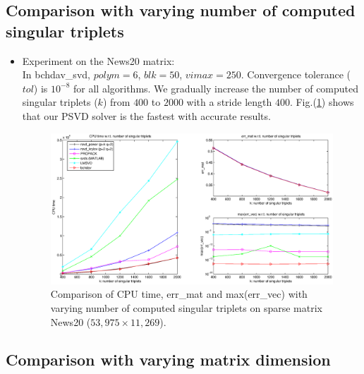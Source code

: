 \documentclass[11pt]{article}
\numberwithin{equation}{section}
\numberwithin{figure}{section}
\numberwithin{table}{section}
\begin{document}
\subsection{Comparison with varying number of computed singular triplets}
\begin{itemize}
\item Experiment on the News20 matrix:\\ 
In bchdav\_svd, $polym = 6$, $blk = 50$, $vimax = 250$. Convergence tolerance ($tol$) is $10^{-8}$ for all algorithms. We gradually increase the number of computed singular triplets ($k$) from $400$ to $2000$ with a stride length $400$. Fig.(\ref{news20_varyk}) shows that our PSVD solver is the fastest with accurate results.

\begin{figure}
\centering
\includegraphics[scale=0.5]{news20_varyk.eps}
\caption{Comparison of CPU time, err\_mat and max(err\_vec) with varying number of computed singular triplets on sparse matrix News20 ($53,975\times11,269$).
}
\label{news20_varyk}
\end{figure}


\end{itemize}
\subsection{Comparison with varying matrix dimension}




\end{document}
